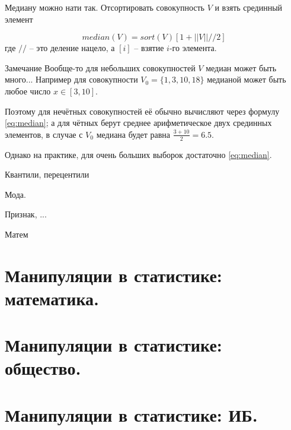 \begin{frame}
	\small
	Медиану можно нати так. Отсортировать совокупность $V$ и взять срединный элемент

	
	\begin{equation}\label{eq:median}
	median(V) = sort(V)\left[1+||V|| // 2 \right]
	\end{equation}
	где $//$ -- это деление нацело, а $[i]$ -- взятие $i$-го элемента.
	
	\begin{block}{Замечание}
		Вообще-то для небольших совокупностей $V$ медиан может быть много... 
		Например для совокупности $V_0=\{1,3,10,18\}$ медианой может быть любое число $x \in [3,10]$.
		
		Поэтому для нечётных совокупностей её обычно вычисляют через формулу \eqref{eq:median};
		а для чётных берут среднее арифметическое двух срединных элементов,
		в случае с $V_0$ медиана будет равна $\frac{3+10}{2}=6.5$.
		
		Однако на практике, для очень больших выборок достаточно \eqref{eq:median}.
	\end{block}
\end{frame}


\begin{frame}{Квантили, перецентили}
\end{frame}

\begin{frame}{Мода.}
\end{frame}

\begin{frame}
\end{frame}

\begin{frame}{Признак, ...}
	
	Матем
	
\end{frame}


\section{Манипуляции в статистике: математика.}

\section{Манипуляции в статистике: общество.}
  
\section{Манипуляции в статистике: ИБ.}


